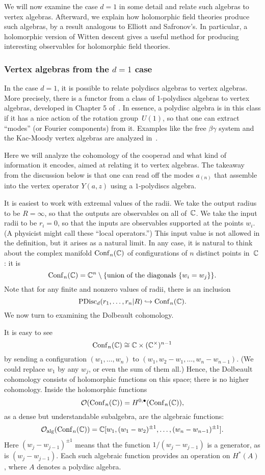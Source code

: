 \documentclass[11pt]{amsart}
\begin{document}
We will now examine the case $d=1$ in some detail and relate such algebras to vertex algebras.
Afterward, we explain how holomorphic field theories produce such algebras,
by a result analogous to Elliott and Safronov's.
In particular, a holomorphic version of Witten descent gives a useful method for producing interesting observables for holomorphic field theories.

\subsubsection{Vertex algebras from the $d=1$ case}

In the case $d=1$, it is possible to relate polydiscs algebras to vertex algebras.
More precisely, there is a functor from a class of 1-polydiscs algebras to vertex algebras,
developed in Chapter 5 of~\cite{CG1}.
In essence, a polydisc algebra is in this class if it has a nice action of the rotation group~$U(1)$,
so that one can extract ``modes'' (or Fourier components) from it.
Examples like the free $\beta\gamma$ system and the Kac-Moody vertex algebras are analyzed in~\cite{CG1}.

Here we will analyze the cohomology of the cooperad and what kind of information it encodes, 
aimed at relating it to vertex algebras.
The takeaway from the discussion below is that one can read off the modes $a_{(n)}$ that assemble into the vertex operator $Y(a,z)$ using a $1$-polydiscs algebra.

It is easiest to work with extremal values of the radii.
We take the output radius to be $R = \infty$,
so that the outputs are observables on all of~$\mathbb C$.
We take the input radii to be $r_i = 0$,
so that the inputs are observables supported at the points $w_i$.
(A physicist might call these ``local operators.'')
This input value is not allowed in the definition, but it arises as a natural limit.
In any case, it is natural to think about the complex manifold ${\rm Conf}_n(\mathbb C)$ of configurations of $n$ distinct points in~$\mathbb C$:
it is
\[
{\rm Conf}_n(\mathbb C) = \mathbb C^n \setminus \{\text{union of the diagonals $\{ w_i = w_j\}$}\}.
\]
Note that for any finite and nonzero values of radii, there is an inclusion
\[
{\rm PDisc}_d(r_1, \ldots, r_n| R) \hookrightarrow {\rm Conf}_n(\mathbb C).
\]
We now turn to examining the Dolbeault cohomology.

It is easy to see
\[
{\rm Conf}_n(\mathbb C) \cong \mathbb C \times (\mathbb C^\times)^{n-1}
\]
by sending a configuration $(w_1,\ldots, w_n)$ to $(w_1, w_2 - w_1, \ldots, w_n-w_{n-1})$.
(We could replace $w_1$ by any $w_j$, or even the sum of them all.)
Hence, the Dolbeault cohomology consists of holomorphic functions on this space;
there is no higher cohomology.
Inside the holomorphic functions 
\[
\mathcal O({\rm Conf}_n(\mathbb C)) = H^{0,\bullet}({\rm Conf}_n(\mathbb C)),
\] 
as a dense but understandable subalgebra, are the algebraic functions:
\[
\mathcal O_{\rm alg}({\rm Conf}_n(\mathbb C)) = \mathbb C[w_1, (w_1 - w_2)^{\pm 1}, \ldots, (w_n - w_{n-1})^{\pm 1}].
\]
Here $(w_j - w_{j-1})^{\pm 1}$ means that the function $1/(w_j - w_{j-1})$ is a generator, 
as is $(w_j - w_{j-1})$.
Each such algebraic function provides an operation on $H^*(A)$, where $A$ denotes a polydisc algebra.
\end{document}
